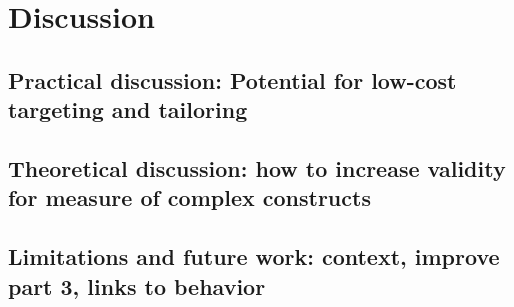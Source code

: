 
\chapter{Discussion} \label{chap:discussion}

\section{Practical discussion: Potential for low-cost targeting and tailoring}

\section{Theoretical discussion: how to increase validity for measure of complex constructs}

\section{Limitations and future work: context, improve part 3, links to behavior}
